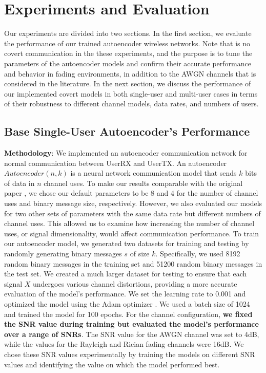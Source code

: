 \section{Experiments and Evaluation}
\label{s:eval}
Our experiments are divided into two sections. In the first section, we evaluate the performance of our trained autoencoder wireless networks. Note that is no covert communication in the these experiments, and the purpose is to tune the parameters of the autoencoder models and confirm their accurate performance and behavior in fading environments, in addition to the AWGN channels that is considered in the literature. In the next section, we discuss the performance of our implemented covert models in both single-user and multi-user cases in terms of their robustness to different channel models, data rates, and numbers of users.

\subsection{Base Single-User Autoencoder's Performance}
\textbf{Methodology}: We implemented an autoencoder communication network for normal communication between UserRX and UserTX. An autoencoder \(Autoencoder (n, k)\) is a neural network communication model that sends \(k\) bits of data in \(n\) channel uses. To make our results comparable with the original paper \cite{o2017introduction}, we chose our default parameters to be 8 and 4 for the number of channel uses and binary message size, respectively. However, we also evaluated our models for two other sets of parameters with the same data rate but different numbers of channel uses. This allowed us to examine how increasing the number of channel uses, or signal dimensionality, would affect communication performance. To train our autoencoder model, we generated two datasets for training and testing by randomly generating binary messages \(s\) of size \(k\). Specifically, we used 8192 random binary messages in the training set and 51200 random binary messages in the test set. We created a much larger dataset for testing to ensure that each signal \(X\) undergoes various channel distortions, providing a more accurate evaluation of the model's performance. We set the learning rate to 0.001 and optimized the model using the Adam optimizer \cite{kingma2014adam}. We used a batch size of 1024 and trained the model for 100 epochs. For the channel configuration, \textbf{we fixed the SNR value during training but evaluated the model's performance over a range of SNRs}. The SNR value for the AWGN channel was set to 4dB, while the values for the Rayleigh and Rician fading channels were 16dB. We chose these SNR values experimentally by training the models on different SNR values and identifying the value on which the model performed best.

